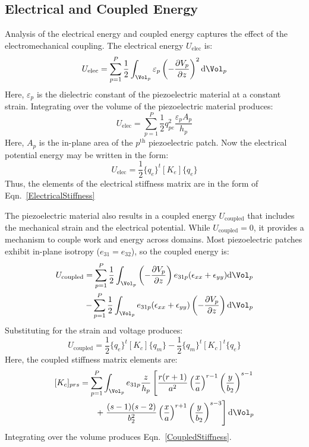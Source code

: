 \documentclass{article}
\begin{document}
\begin{body}
\begin{appendices}
{\subsection{Electrical and Coupled Energy}
Analysis of the electrical energy and coupled energy captures the effect of the electromechanical coupling. The electrical energy $U_{\text{elec}}$ is:
\begin{equation}
U_{\text{elec}}=\sum_{p=1}^P \frac{1}{2}\int_{\Vol_p} \varepsilon_p \left(-\frac{\partial V_p}{\partial z} \right)^2 \text{d}\Vol_p
\end{equation}
Here, $\varepsilon_p$ is the dielectric constant of the piezoelectric material at a constant strain. Integrating over the volume of the piezoelectric material produces:
\begin{equation}
U_{\text{elec}}=\sum_{p=1}^P \frac{1}{2}q_{pe}^2 \frac{\varepsilon_p A_p}{h_p}
\end{equation}
Here, $A_p$ is the in-plane area of the $p^{\text{th}}$ piezoelectric patch. Now the electrical potential energy may be written in the form:
\begin{equation}
U_{\text{elec}}=\frac{1}{2}\{q_e\}^t [K_e] \{q_e\}
\end{equation}
Thus, the elements of the electrical stiffness matrix are in the form of Eqn.~\eqref{ElectricalStiffness}

The piezoelectric material also results in a coupled energy $U_{\text{coupled}}$ that includes the mechanical strain and the electrical potential. While $U_{\text{coupled}}=0$, it provides a mechanism to couple work and energy across domains. Most piezoelectric patches exhibit in-plane isotropy ($e_{31}=e_{32}$), so the coupled energy is:
\begin{equation}
\begin{split}
U_{\text{coupled}}=\sum_{p=1}^P \frac{1}{2}\int_{\Vol_p}\left(-\frac{\partial V_p}{\partial z} \right)e_{31p} (\epsilon_{xx}+\epsilon_{yy})\text{d}\Vol_p \\
-\sum_{p=1}^P\frac{1}{2}\int_{\Vol_p}e_{31p} (\epsilon_{xx}+\epsilon_{yy})\left(-\frac{\partial V_p}{\partial z} \right)\text{d}\Vol_p
\end{split}
\end{equation}
Substituting for the strain and voltage produces:
\begin{equation}
U_{\text{coupled}}=\frac{1}{2}\{q_e\}^t[K_c]\{q_m\}-\frac{1}{2}\{q_m\}^t[K_c]^t \{q_e\}
\end{equation}
Here, the coupled stiffness matrix elements are:
\begin{equation}
\begin{split}
[K_c]_{prs}=\sum_{p=1}^P \int_{\Vol_p} e_{31p} \frac{z}{h_p}\left[\frac{r(r+1)}{a^2}\left(\frac{x}{a}\right)^{r-1}\left(\frac{y}{b_2}\right)^{s-1}\right. \\
+\left. \frac{(s-1)(s-2)}{b_2^2}\left(\frac{x}{a}\right)^{r+1}\left(\frac{y}{b_2}\right)^{s-3}\right] \text{d}\Vol_p
\end{split}
\end{equation}
Integrating over the volume produces Eqn.~\eqref{CoupledStiffness}.



}
\end{appendices}
\end{body}
\end{document}
